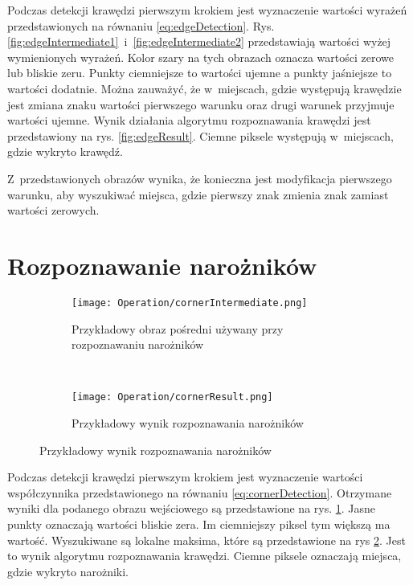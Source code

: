 Podczas detekcji krawędzi pierwszym krokiem jest wyznaczenie wartości wyrażeń przedstawionych na równaniu \eqref{eq:edgeDetection}. Rys. \ref{fig:edgeIntermediate1}~i~\ref{fig:edgeIntermediate2} przedstawiają wartości wyżej wymienionych wyrażeń. Kolor szary na tych obrazach oznacza wartości zerowe lub bliskie zeru. Punkty ciemniejsze to wartości ujemne a punkty jaśniejsze to wartości dodatnie. Można zauważyć, że w~miejscach, gdzie występują krawędzie jest zmiana znaku wartości pierwszego warunku oraz drugi warunek przyjmuje wartości ujemne. Wynik działania algorytmu rozpoznawania krawędzi jest przedstawiony na rys. \ref{fig:edgeResult}. Ciemne piksele występują w~miejscach, gdzie wykryto krawędź.

Z~przedstawionych obrazów wynika, że konieczna jest modyfikacja pierwszego warunku, aby wyszukiwać miejsca, gdzie pierwszy znak zmienia znak zamiast wartości zerowych.

\section{Rozpoznawanie narożników}
\label{sec:dzialanieCorner}

\begin{figure}[h]
\begin{center}

\begin{subfigure}[t]{0.4\textwidth}
\texttt{[image: Operation/cornerIntermediate.png]}
\caption{Przykładowy obraz pośredni używany przy rozpoznawaniu narożników}
\label{fig:cornerIntermediate}
\end{subfigure}
~
\begin{subfigure}[t]{0.4\textwidth}
\texttt{[image: Operation/cornerResult.png]}
\caption{Przykładowy wynik rozpoznawania narożników}
\label{fig:cornerResult}
\end{subfigure}

\end{center}
\label{fig:showEdge}
\end{figure}

Podczas detekcji krawędzi pierwszym krokiem jest wyznaczenie wartości współczynnika przedstawionego na równaniu \eqref{eq:cornerDetection}. Otrzymane wyniki dla podanego obrazu wejściowego są przedstawione na rys. \ref{fig:cornerIntermediate}. Jasne punkty oznaczają wartości bliskie zera. Im ciemniejszy piksel tym większą ma wartość. Wyszukiwane są lokalne maksima, które są przedstawione na rys \ref{fig:cornerResult}. Jest to wynik algorytmu rozpoznawania krawędzi. Ciemne piksele oznaczają miejsca, gdzie wykryto narożniki.

